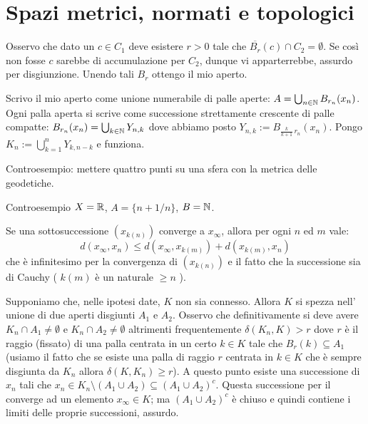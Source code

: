 \section{Spazi metrici, normati e topologici}

 Osservo che dato un $c\in C_1$ deve esistere $r>0$ tale che $\overline{B_{r}}(c)\cap C_2=\emptyset$. Se così non fosse $c$ sarebbe di accumulazione per $C_2$, dunque vi apparterrebbe, assurdo per disgiunzione. Unendo tali $B_r$ ottengo il mio aperto.

 Scrivo il mio aperto come unione numerabile di palle aperte: $A=\bigcup_{n\in\mathbb{N}}B_{r_n}(x_n)$. Ogni palla aperta si scrive come successione strettamente crescente di palle compatte: $B_{r_n}(x_n)=\bigcup_{k\in\mathbb{N}}Y_{n,k}$ dove abbiamo posto $Y_{n,k}:=B_{ \frac {k}{k+1}\, r_n}(x_n)$. Pongo $\displaystyle K_n:=\bigcup_{k=1}^n Y_{k,n-k}$ e funziona.

 Controesempio: mettere quattro punti su una sfera con la metrica delle geodetiche.

 Controesempio $X=\mathbb{R}$, $A=\{n+1/n\}$, $B=\mathbb{N}$.

 Se una sottosuccessione \( (x_{k(n)})\) converge a \(x_{\infty}\), allora per ogni \(n\) ed $m$ vale: 
\[ d(x_{\infty},x_n) \le d\left({x_{\infty}, x_{k(m)}}\right) + d\left({x_{k(m)},x_n}\right) \]
che è infinitesimo per la convergenza di \( \left({x_{k(n)}}\right)\) e il fatto che la successione sia di Cauchy ( \(k(m)\) è un naturale \(\ge n\) ).

 Supponiamo che, nelle ipotesi date, $K$ non sia connesso. Allora $K$ si spezza nell' unione di due aperti disgiunti $A_1$ e $A_2$. Osservo che definitivamente si deve avere $K_n \cap A_1 \neq \emptyset$ e $K_n \cap A_2 \neq \emptyset$ altrimenti frequentemente $\delta (K_n, K)>r$ dove $r$ è il raggio (fissato) di una palla centrata in un certo $k\in K$ tale che $B_r(k)\subseteq A_1$ (usiamo il fatto che se esiste una palla di raggio $r$ centrata in $k\in K$ che è sempre disgiunta da $K_n$ allora $\delta(K,K_n)\geq r$). A questo punto esiste una successione di $x_n$ tali che $x_n\in K_n\setminus (A_1 \cup A_2)\subseteq (A_1 \cup A_2)^c$. Questa successione per il  converge ad un elemento $x_{\infty}\in K$; ma $(A_1 \cup A_2)^c$ è chiuso e quindi contiene i limiti delle proprie successioni, assurdo.

